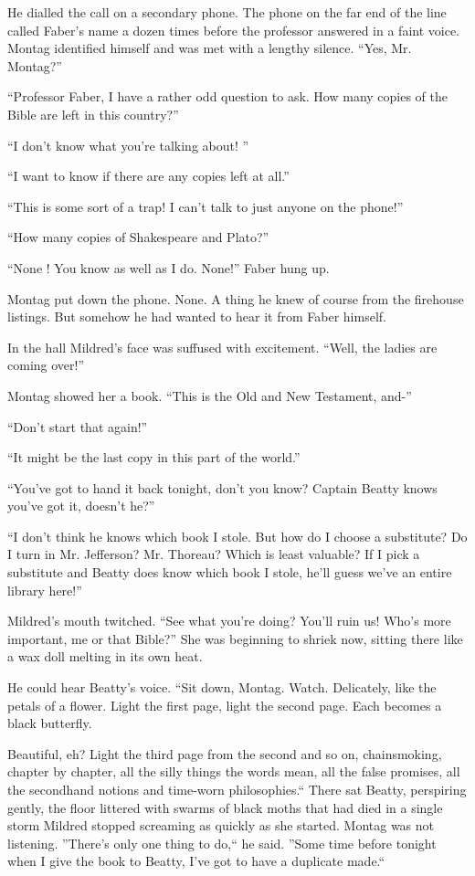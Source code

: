 \documentclass[11pt,openany]{book}
\begin{document}
He dialled the call on a secondary phone. The phone on the far end of the line called Faber's name a dozen times before the professor answered in a faint voice. Montag identified himself and was met with a lengthy silence. ``Yes, Mr. Montag?''

``Professor Faber, I have a rather odd question to ask. How many copies of the Bible are left in this country?''

``I don't know what you're talking about! ''

``I want to know if there are any copies left at all.''

``This is some sort of a trap! I can't talk to just anyone on the phone!''

``How many copies of Shakespeare and Plato?''

``None ! You know as well as I do. None!'' Faber hung up.

Montag put down the phone. None. A thing he knew of course from the firehouse listings. But somehow he had wanted to hear it from Faber himself.

In the hall Mildred's face was suffused with excitement. ``Well, the ladies are coming over!''

Montag showed her a book. ``This is the Old and New Testament, and-''

``Don't start that again!''

``It might be the last copy in this part of the world.''

``You've got to hand it back tonight, don't you know? Captain Beatty knows you've got it, doesn't he?''

``I don't think he knows which book I stole. But how do I choose a substitute? Do I turn in Mr. Jefferson? Mr. Thoreau? Which is least valuable? If I pick a substitute and Beatty does know which book I stole, he'll guess we've an entire library here!''

Mildred's mouth twitched. ``See what you're doing? You'll ruin us! Who's more important, me or that Bible?'' She was beginning to shriek now, sitting there like a wax doll melting in its own heat.

He could hear Beatty's voice. ``Sit down, Montag. Watch. Delicately, like the petals of a flower. Light the first page, light the second page. Each becomes a black butterfly.

Beautiful, eh? Light the third page from the second and so on, chainsmoking, chapter by chapter, all the silly things the words mean, all the false promises, all the secondhand notions and time-worn philosophies.`` There sat Beatty, perspiring gently, the floor littered with swarms of black moths that had died in a single storm Mildred stopped screaming as quickly as she started. Montag was not listening. ''There's only one thing to do,`` he said. ''Some time before tonight when I give the book to Beatty, I've got to have a duplicate made.``
\end{document}

